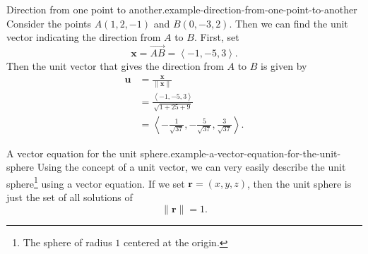 \documentclass[10pt,]{book}
\numberwithin{equation}{section}
\newcommand{\vv}[1]{\mathbf{#1}}
\newcommand{\dotprod}[1]{\left\langle #1 \right\rangle}
\begin{document}
\begin{example}{Direction from one point to another.}{example-direction-from-one-point-to-another}%
\hypertarget{p-1114}{}%
Consider the points \(A(1,2,-1)\) and \(B(0,-3,2)\). Then we can find the unit vector indicating the direction from \(A\) to \(B\). First, set%
%
\begin{equation*}
\vv{x} = \overrightarrow{AB} = \dotprod{-1,-5,3}.
\end{equation*}
\hypertarget{p-1115}{}%
Then the unit vector that gives the direction from \(A\) to \(B\) is given by%
%
\begin{align*}
\vv{u} & = \frac{\vv{x}}{\|\vv{x}\|} \\
& = \frac{\dotprod{-1,-5,3}}{\sqrt{1+25+9}} \\
& = \dotprod{-\frac{1}{\sqrt{37}}, -\frac{5}{\sqrt{37}}, \frac{3}{\sqrt{37}}}. 
\end{align*}
\end{example}
\begin{example}{A vector equation for the unit sphere.}{example-a-vector-equation-for-the-unit-sphere}%
\hypertarget{p-1116}{}%
Using the concept of a unit vector, we can very easily describe the unit sphere\footnote{The sphere of radius \(1\) centered at the origin.\label{fn-3}} using a vector equation. If we set \(\vv{r} = (x,y,z)\), then the unit sphere is just the set of all solutions of%
%
\begin{equation*}
\|\vv{r}\| = 1.
\end{equation*}
\end{example}
%
%
\typeout{************************************************}
\typeout{************************************************}
%
\end{document}
